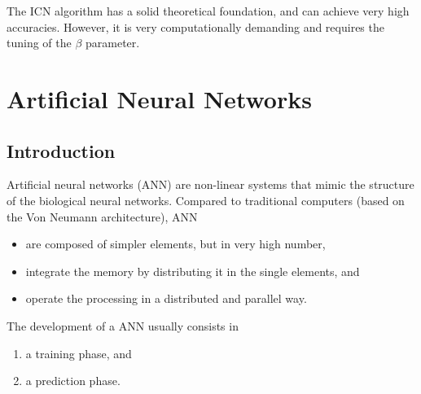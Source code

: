 \documentclass[oneside,onecolumn]{report}
\begin{document}
The ICN algorithm has a solid theoretical foundation, and can achieve very high accuracies.
However, it is very computationally demanding and requires the tuning of the $\beta$ parameter.


\clearpage
\chapter{Artificial Neural Networks}
\section{Introduction}
Artificial neural networks (ANN) are non-linear systems that mimic the structure of the biological neural networks.
Compared to traditional computers (based on the Von Neumann architecture), ANN
\begin{itemize}
    \item are composed of simpler elements, but in very high number,
    \item integrate the memory by distributing it in the single elements, and
    \item operate the processing in a distributed and parallel way.
\end{itemize}

The development of a ANN usually consists in
\begin{enumerate}
    \item a training phase, and
    \item a prediction phase.
\end{enumerate}
\end{document}
